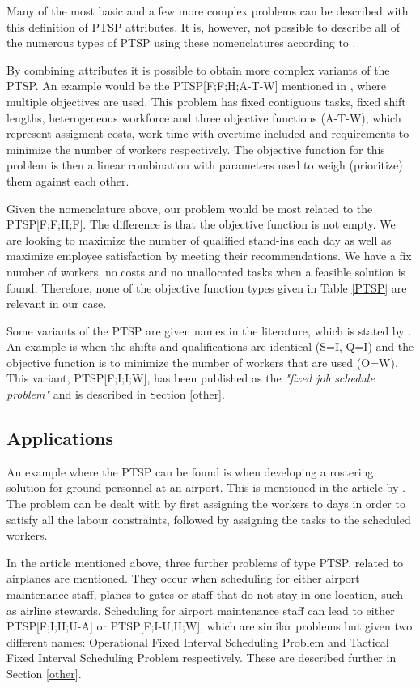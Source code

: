 Many of the most basic and a few more complex problems can be described with this definition of PTSP attributes. It is, however, not possible to describe all of the numerous types of PTSP using these nomenclatures according to \citet{krishnamoorthy_2001}.

By combining attributes it is possible to obtain more complex variants of the PTSP. An example would be the PTSP[F;F;H;A-T-W] mentioned in \citet{krishnamoorthy_2001}, where multiple objectives are used. This problem has fixed contiguous tasks, fixed shift lengths, heterogeneous workforce and three objective functions (A-T-W), which represent assigment costs, work time with overtime included and requirements to minimize the number of workers respectively. The objective function for this problem is then a linear combination with parameters used to weigh (prioritize) them against each other.

Given the nomenclature above, our problem would be most related to the PTSP[F;F;H;F]. The difference is that the objective function is not empty. We are looking to maximize the number of qualified stand-ins each day as well as maximize employee satisfaction by meeting their recommendations. We have a fix number of workers, no costs and no unallocated tasks when a feasible solution is found. Therefore, none of the objective function types given in Table \ref{PTSP} are relevant in our case.

Some variants of the PTSP are given names in the literature, which is stated by \citet{krishnamoorthy_2001}. An example is when the shifts and qualifications are identical (S=I, Q=I) and the objective function is to minimize the number of workers that are used (O=W). This variant, PTSP[F;I;I;W], has been published as the \textit{"fixed job schedule problem"} and is described in Section \ref{other}.

\subsection{Applications}
An example where the PTSP can be found is when developing a rostering solution for ground personnel at an airport. This is mentioned in the article by \citet{krishnamoorthy_2001}. The problem can be dealt with by first assigning the workers to days in order to satisfy all the labour constraints, followed by assigning the tasks to the scheduled workers.

In the article mentioned above, three further problems of type PTSP, related to airplanes are mentioned. They occur when scheduling for either airport maintenance staff, planes to gates or staff that do not stay in one location, such as airline stewards. Scheduling for airport maintenance staff can lead to either PTSP[F;I;H;U-A] or PTSP[F;I-U;H;W], which are similar problems but given two different names: Operational Fixed Interval Scheduling Problem and Tactical Fixed Interval Scheduling Problem respectively. These are described further in Section \ref{other}. 

